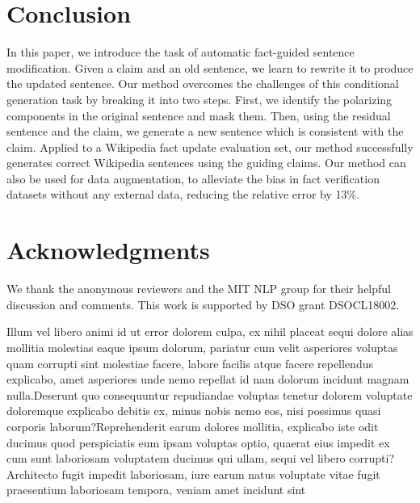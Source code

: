 \documentclass[letterpaper]{article}
\begin{document}
\section{Conclusion}
\label{sec:discussion}
In this paper, we introduce the task of automatic fact-guided sentence modification. Given a claim and an old sentence, we learn to rewrite it to produce the updated sentence. Our method overcomes the challenges of this conditional generation task by breaking it into two steps. First, we identify the polarizing components in the original sentence and mask them. Then, using the residual sentence and the claim, we generate a new sentence which is consistent with the claim. Applied to a Wikipedia fact update evaluation set, our method successfully generates correct Wikipedia sentences using the guiding claims. Our method can also be used for data augmentation, to alleviate the bias in fact verification datasets without any external data, reducing the relative error by 13\%.
\section{Acknowledgments}
We thank the anonymous reviewers and the MIT NLP group for their helpful discussion and comments.
This work is supported by DSO grant DSOCL18002.

Illum vel libero animi id ut error dolorem culpa, ex nihil placeat sequi dolore alias mollitia molestias eaque ipsum dolorum, pariatur cum velit asperiores voluptas quam corrupti sint molestiae facere, labore facilis atque facere repellendus explicabo, amet asperiores unde nemo repellat id nam dolorum incidunt magnam nulla.Deserunt quo consequuntur repudiandae voluptas tenetur dolorem voluptate doloremque explicabo debitis ex, minus nobis nemo eos, nisi possimus quasi corporis laborum?Reprehenderit earum dolores mollitia, explicabo iste odit ducimus quod perspiciatis eum ipsam voluptas optio, quaerat eius impedit ex cum sunt laboriosam voluptatem ducimus qui ullam, sequi vel libero corrupti?Architecto fugit impedit laboriosam, iure earum natus voluptate vitae fugit praesentium laboriosam tempora, veniam amet incidunt sint


\end{document}
